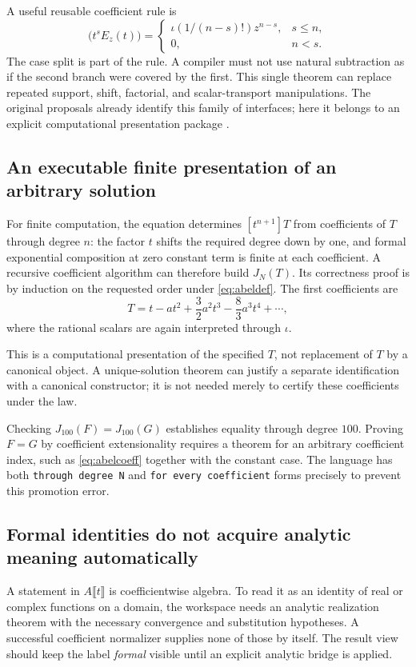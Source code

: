 \documentclass[11pt,letterpaper]{article}
\newcommand{\code}[1]{\nolinkurl{#1}}
\numberwithin{equation}{section}
\begin{document}
A useful reusable coefficient rule is
\begin{equation}
 [t^n]\bigl(t^sE_z(t)\bigr)=
 \begin{cases}
  \iota(1/(n-s)!)z^{n-s},&s\le n,\\
  0,&n<s.
 \end{cases}                                         \label{eq:shiftexp}
\end{equation}
The case split is part of the rule. A compiler must not use natural subtraction
as if the second branch were covered by the first. This single theorem can
replace repeated support, shift, factorial, and scalar-transport manipulations.
The original proposals already identify this family of interfaces; here it
belongs to an explicit computational presentation package
\cite{synthesis,blueprints,p-abel}.

\subsection{An executable finite presentation of an arbitrary solution}
For finite computation, the equation determines $[t^{n+1}]T$ from coefficients
of $T$ through degree $n$: the factor $t$ shifts the required degree down by
one, and formal exponential composition at zero constant term is finite at each
coefficient. A recursive coefficient algorithm can therefore build $J_N(T)$.
Its correctness proof is by induction on the requested order under
\eqref{eq:abeldef}. The first coefficients are
\[
 T=t-at^2+\frac32a^2t^3-\frac83a^3t^4+\cdots,
\]
where the rational scalars are again interpreted through $\iota$.

This is a computational presentation of the specified $T$, not replacement of
$T$ by a canonical object. A unique-solution theorem can justify a separate
identification with a canonical constructor; it is not needed merely to certify
these coefficients under the law.

Checking $J_{100}(F)=J_{100}(G)$ establishes equality through degree $100$.
Proving $F=G$ by coefficient extensionality requires a theorem for an arbitrary
coefficient index, such as \eqref{eq:abelcoeff} together with the constant case.
The language has both \code{through degree N} and \code{for every coefficient}
forms precisely to prevent this promotion error.

\subsection{Formal identities do not acquire analytic meaning automatically}
A statement in $A\llbracket t\rrbracket$ is coefficientwise algebra. To read it
as an identity of real or complex functions on a domain, the workspace needs
an analytic realization theorem with the necessary convergence and substitution
hypotheses. A successful coefficient normalizer supplies none of those by itself.
The result view should keep the label \emph{formal} visible until an explicit
analytic bridge is applied.
\end{document}
